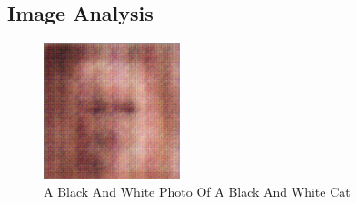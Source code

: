 \documentclass{article}%
\begin{document}
%
\subsection{Image Analysis}%
\label{subsec:ImageAnalysis}%


\begin{figure}[h!]%
\centering%
\includegraphics[width=150px]{500_fake_images/samples_5_299.png}%
\caption{A Black And White Photo Of A Black And White Cat}%
\end{figure}

%
\end{document}
